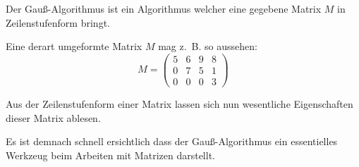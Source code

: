 Der Gauß-Algorithmus ist ein Algorithmus welcher eine gegebene Matrix $M$ in Zeilenstufenform bringt.

Eine derart umgeformte Matrix $M$ mag z.~B. so aussehen:
\[ M = \begin{pmatrix}
5 & 6 & 9 & 8\\ 
0 & 7 & 5 & 1\\ 
0 & 0 & 0 & 3
\end{pmatrix} \]

Aus der Zeilenstufenform einer Matrix lassen sich nun wesentliche Eigenschaften dieser Matrix ablesen.

Es ist demnach schnell ersichtlich dass der Gauß-Algorithmus ein essentielles Werkzeug beim Arbeiten mit Matrizen darstellt.